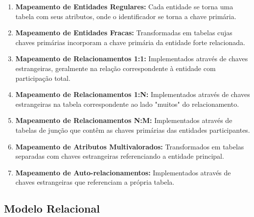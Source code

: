 \documentclass[12pt,a4paper]{article}
\begin{document}
\begin{conceptbox}
\begin{enumerate}
    \item \textbf{Mapeamento de Entidades Regulares:} Cada entidade se torna uma tabela com seus atributos, onde o identificador se torna a chave primária.
    
    \item \textbf{Mapeamento de Entidades Fracas:} Transformadas em tabelas cujas chaves primárias incorporam a chave primária da entidade forte relacionada.
    
    \item \textbf{Mapeamento de Relacionamentos 1:1:} Implementados através de chaves estrangeiras, geralmente na relação correspondente à entidade com participação total.
    
    \item \textbf{Mapeamento de Relacionamentos 1:N:} Implementados através de chaves estrangeiras na tabela correspondente ao lado "muitos" do relacionamento.
    
    \item \textbf{Mapeamento de Relacionamentos N:M:} Implementados através de tabelas de junção que contêm as chaves primárias das entidades participantes.
    
    \item \textbf{Mapeamento de Atributos Multivalorados:} Transformados em tabelas separadas com chaves estrangeiras referenciando a entidade principal.
    
    \item \textbf{Mapeamento de Auto-relacionamentos:} Implementados através de chaves estrangeiras que referenciam a própria tabela.
\end{enumerate}
\end{conceptbox}

\subsection{Modelo Relacional}
\end{document}
